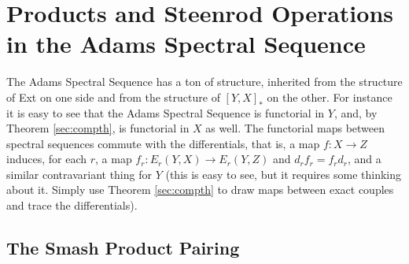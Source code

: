 \section{Products and Steenrod Operations in the Adams Spectral Sequence}

The Adams Spectral Sequence has a ton of structure, inherited from the structure of Ext on one side and from the structure of $[Y,X]_*$ on the other.
For instance it is easy to see that the Adams Spectral Sequence is functorial in $Y$, and, by Theorem \ref{sec:compth}, is functorial in $X$ as well.
The functorial maps between spectral sequences commute with the differentials, that is, a map $f:X\to Z$ induces, for each $r$, a map $f_r :E_r(Y,X)\to E_r(Y,Z)$ and $d_rf_r=f_rd_r$, and a similar contravariant thing for $Y$ (this is easy to see, but it requires some thinking about it.  Simply use Theorem \ref{sec:compth} to draw maps between exact couples and trace the differentials).  

\subsection{The Smash Product Pairing}

